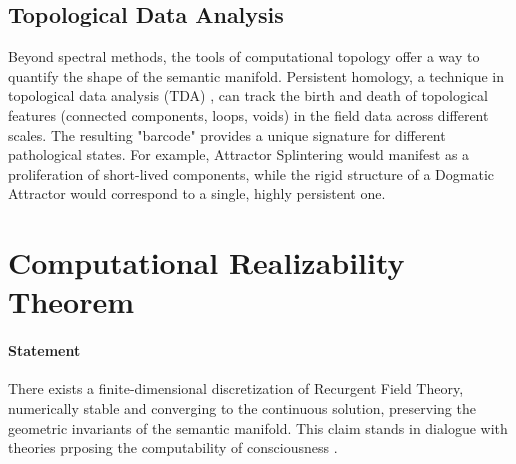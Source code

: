 \subsection{Topological Data Analysis}

Beyond spectral methods, the tools of computational topology offer a way to quantify the shape of the semantic manifold. Persistent homology, a technique in topological data analysis (TDA) \autocite{EdelsbrunnerHarer2010}, can track the birth and death of topological features (connected components, loops, voids) in the field data across different scales. The resulting "barcode" provides a unique signature for different pathological states. For example, Attractor Splintering would manifest as a proliferation of short-lived components, while the rigid structure of a Dogmatic Attractor would correspond to a single, highly persistent one.

\section{Computational Realizability Theorem}

\paragraph{Statement}
There exists a finite-dimensional discretization of Recurgent Field Theory, numerically stable and converging to the continuous solution, preserving the geometric invariants of the semantic manifold. This claim stands in dialogue with theories prposing the computability of consciousness \autocite{KochConsciousness2019}.

